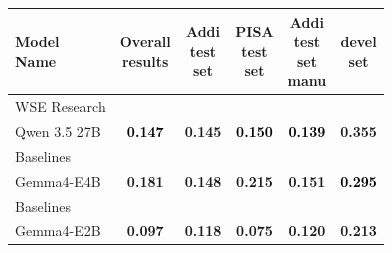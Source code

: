 \begin{tabularx}{\textwidth}{X | c c c c c}
\hline
\makecell[b]{\textbf{Model} \\ \textbf{Name}} & \makecell[b]{\textbf{Overall} \\ \textbf{results}} & \makecell[b]{\textbf{Addi} \\ \textbf{test} \\ \textbf{set}} & \makecell[b]{\textbf{PISA} \\ \textbf{test} \\ \textbf{set}} & \makecell[b]{\textbf{Addi} \\ \textbf{test} \\ \textbf{set} \\ \textbf{manu}} & \makecell[b]{\textbf{devel} \\ \textbf{set}} \\
\hline
WSE Research\\\subcatarrow{}Qwen 3.5 27B & \textbf{\textcolor{Black}{0.147}} & \textbf{\textcolor{BrickRed}{0.145}} & \textbf{\textcolor{Black}{0.150}} & \textbf{\textcolor{Black}{0.139}} & \textbf{\textcolor{BrickRed}{0.355}} \\
Baselines\\\subcatarrow{}Gemma4-E4B & \textbf{\textcolor{BrickRed}{0.181}} & \textbf{\textcolor{BrickRed}{0.148}} & \textbf{\textcolor{BrickRed}{0.215}} & \textbf{\textcolor{BrickRed}{0.151}} & \textbf{\textcolor{Black}{0.295}} \\
Baselines\\\subcatarrow{}Gemma4-E2B & \textbf{\textcolor{NavyBlue}{0.097}} & \textbf{\textcolor{NavyBlue}{0.118}} & \textbf{\textcolor{NavyBlue}{0.075}} & \textbf{\textcolor{NavyBlue}{0.120}} & \textbf{\textcolor{NavyBlue}{0.213}} \\
\hline
\end{tabularx}